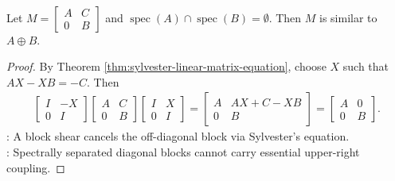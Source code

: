 \begin{corollary} \label{cor:block-upper-triangular-remove-disjoint-coupling} \\
Let $M=\begin{bmatrix}A&C\\0&B\end{bmatrix}$ and $\operatorname{spec}(A)\cap\operatorname{spec}(B)=\emptyset$. Then $M$ is similar to $A\oplus B$.
\begin{proof}
By Theorem \ref{thm:sylvester-linear-matrix-equation}, choose $X$ such that $AX-XB=-C$. Then
\begin{align}
\begin{bmatrix}I&-X\\0&I\end{bmatrix}
\begin{bmatrix}A&C\\0&B\end{bmatrix}
\begin{bmatrix}I&X\\0&I\end{bmatrix}
=
\begin{bmatrix}A&AX+C-XB\\0&B\end{bmatrix}
=
\begin{bmatrix}A&0\\0&B\end{bmatrix}.
\nonumber
\end{align}
: A block shear cancels the off-diagonal block via Sylvester's equation.\\
: Spectrally separated diagonal blocks cannot carry essential upper-right coupling.
\end{proof}
\end{corollary}

